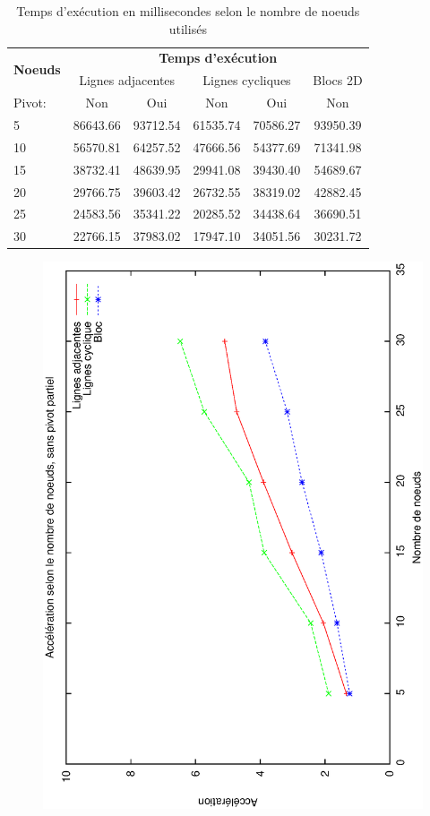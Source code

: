 \documentclass[12pt,letterpaper]{article} %
\begin{document}
\begin{table}[h!]
 \centering
\begin{tabular}{|l|c|c|c|c|c|}
\hline
\multirow{2}{*}{\bf{Noeuds}}& \multicolumn{5}{|c|}{\bf{Temps d'exécution}} \\ \cline{2-6}
& \multicolumn{2}{|c|}{Lignes adjacentes} & \multicolumn{2}{|c|}{Lignes cycliques} & Blocs 2D \\ \hline
Pivot: & Non & Oui & Non & Oui & Non \\ \hline
5&86643.66&93712.54&61535.74&70586.27&93950.39 \\ \hline
10&56570.81&64257.52&47666.56&54377.69&71341.98 \\ \hline
15&38732.41&48639.95&29941.08&39430.40&54689.67 \\ \hline
20&29766.75&39603.42&26732.55&38319.02&42882.45 \\ \hline
25&24583.56&35341.22&20285.52&34438.64&36690.51 \\ \hline
30&22766.15&37983.02&17947.10&34051.56&30231.72 \\ \hline
\end{tabular}
\caption{Temps d'exécution en millisecondes selon le nombre de noeuds utilisés}
\end{table}
\begin{figure}[h!]
\begin{center}
\includegraphics[angle=-90, width=0.65\linewidth]{noeuds.eps}
\end{center}
\end{figure}
\end{document}
